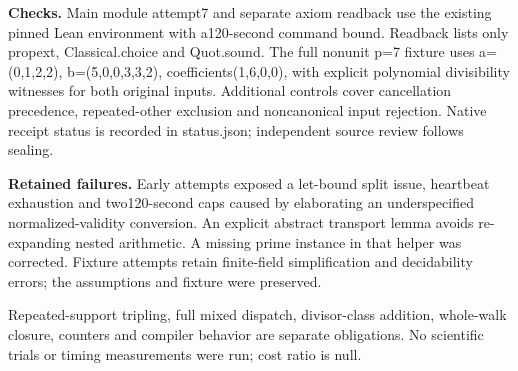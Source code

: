 \documentclass[10pt]{article}
\begin{document}
\textbf{Checks.} Main module attempt7 and separate axiom readback use the existing pinned Lean environment with a120-second command bound. Readback lists only propext, Classical.choice and Quot.sound. The full nonunit p=7 fixture uses a=(0,1,2,2), b=(5,0,0,3,3,2), coefficients(1,6,0,0), with explicit polynomial divisibility witnesses for both original inputs. Additional controls cover cancellation precedence, repeated-other exclusion and noncanonical input rejection. Native receipt status is recorded in status.json; independent source review follows sealing.

\textbf{Retained failures.} Early attempts exposed a let-bound split issue, heartbeat exhaustion and two120-second caps caused by elaborating an underspecified normalized-validity conversion. An explicit abstract transport lemma avoids re-expanding nested arithmetic. A missing prime instance in that helper was corrected. Fixture attempts retain finite-field simplification and decidability errors; the assumptions and fixture were preserved.

Repeated-support tripling, full mixed dispatch, divisor-class addition, whole-walk closure, counters and compiler behavior are separate obligations. No scientific trials or timing measurements were run; cost ratio is null.
\end{document}
